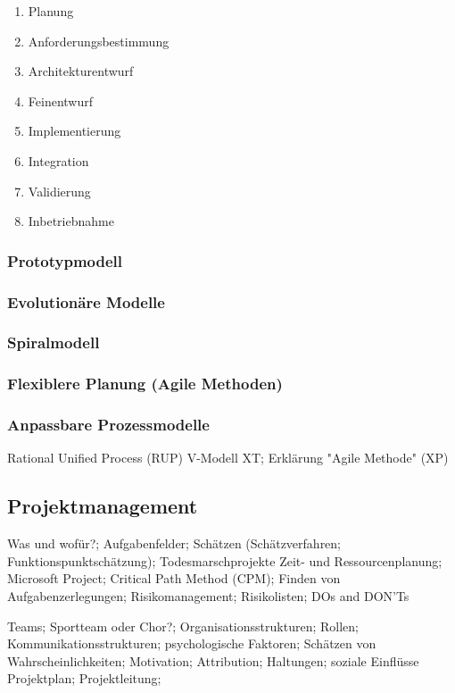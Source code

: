 \begin{enumerate}
\item Planung
\item Anforderungsbestimmung
\item Architekturentwurf
\item Feinentwurf
\item Implementierung
\item Integration
\item Validierung
\item Inbetriebnahme
\end{enumerate}

\subsubsection{Prototypmodell}

\subsubsection{Evolutionäre Modelle}

\subsubsection{Spiralmodell}

\subsubsection{Flexiblere Planung (Agile Methoden)}

\subsubsection{Anpassbare Prozessmodelle}
Rational Unified Process (RUP)
V-Modell XT;
Erklärung "Agile Methode" (XP) 


\subsection{Projektmanagement}
Was und wofür?; Aufgabenfelder;
Schätzen (Schätzverfahren; Funktionspunktschätzung); Todesmarschprojekte 
Zeit- und Ressourcenplanung;
Microsoft Project;
Critical Path Method (CPM);
Finden von Aufgabenzerlegungen;
Risikomanagement; Risikolisten; DOs and DON'Ts 

Teams; Sportteam oder Chor?; Organisationsstrukturen; Rollen; Kommunikationsstrukturen;
psychologische Faktoren; Schätzen von Wahrscheinlichkeiten;
Motivation; Attribution; Haltungen; soziale Einflüsse 
Projektplan; Projektleitung;

